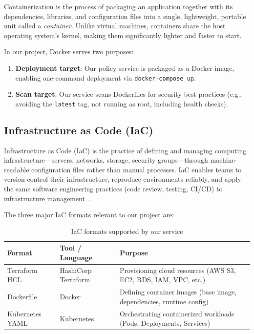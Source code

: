 Containerization is the process of packaging an application together with its dependencies, libraries, and configuration files into a single, lightweight, portable unit called a \textit{container}. Unlike virtual machines, containers share the host operating system's kernel, making them significantly lighter and faster to start.

In our project, Docker serves two purposes:
\begin{enumerate}
    \item \textbf{Deployment target}: Our policy service is packaged as a Docker image, enabling one-command deployment via \texttt{docker-compose up}.
    \item \textbf{Scan target}: Our service scans Dockerfiles for security best practices (e.g., avoiding the \texttt{latest} tag, not running as root, including health checks).
\end{enumerate}

\subsection{Infrastructure as Code (IaC)}

Infrastructure as Code (IaC) is the practice of defining and managing computing infrastructure—servers, networks, storage, security groups—through machine-readable configuration files rather than manual processes. IaC enables teams to version-control their infrastructure, reproduce environments reliably, and apply the same software engineering practices (code review, testing, CI/CD) to infrastructure management~\cite{terraform}.

The three major IaC formats relevant to our project are:

\begin{table}[H]
\centering
\caption{IaC formats supported by our service}
\label{tab:iac-formats}
\begin{tabular}{|p{2.5cm}|p{4cm}|p{6cm}|}
\hline
\textbf{Format} & \textbf{Tool / Language} & \textbf{Purpose} \\
\hline
Terraform HCL & HashiCorp Terraform~\cite{terraform} & Provisioning cloud resources (AWS S3, EC2, RDS, IAM, VPC, etc.) \\
\hline
Dockerfile & Docker~\cite{docker} & Defining container images (base image, dependencies, runtime config) \\
\hline
Kubernetes YAML & Kubernetes~\cite{kubernetes} & Orchestrating containerized workloads (Pods, Deployments, Services) \\
\hline
\end{tabular}
\end{table}

